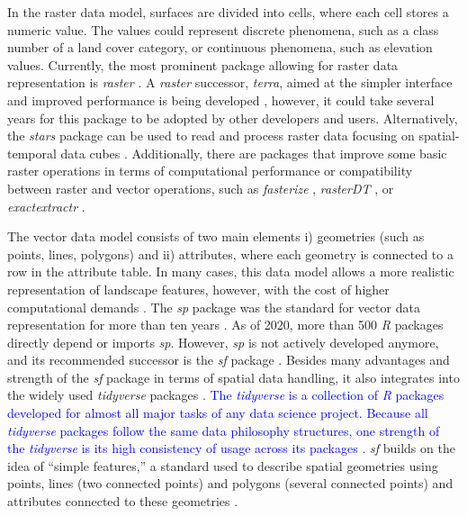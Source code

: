 \documentclass[smallextended]{svjour3}       %
\begin{document}
In the raster data model, surfaces are divided into cells, where each cell stores a numeric value.
The values could represent discrete phenomena, such as a class number of a land cover category, or continuous phenomena, such as elevation values.
Currently, the most prominent package allowing for raster data representation is \textit{raster} \cite{Hijmans2019}.
A \textit{raster} successor, \textit{terra}, aimed at the simpler interface and improved performance is being developed \cite{Hijmans2021}, however, it could take several years for this package to be adopted by other developers and users.
Alternatively, the \textit{stars} package can be used to read and process raster data focusing on spatial-temporal data cubes \cite{Pebesma2019}.
Additionally, there are packages that improve some basic raster operations in terms of computational performance or compatibility between raster and vector operations, such as \textit{fasterize} \cite{Ross2020}, \textit{rasterDT} \cite{OBrien2020}, or \textit{exactextractr} \cite{Baston2020}.

The vector data model consists of two main elements i) geometries (such as points, lines, polygons) and ii) attributes, where each geometry is connected to a row in the attribute table.
In many cases, this data model allows a more realistic representation of landscape features, however, with the cost of higher computational demands \cite{Lovelace2019}.
The \textit{sp} package was the standard for vector data representation for more than ten years \cite{Pebesma2005,Bivand2013}.
As of 2020, more than 500 \textit{R} packages directly depend or imports \textit{sp}.
However, \textit{sp} is not actively developed anymore, and its recommended successor is the \textit{sf} package \cite{Pebesma2018}.
Besides many advantages and strength of the \textit{sf} package in terms of spatial data handling, it also integrates into the widely used \textit{tidyverse} packages \cite{Wickham2019}.
\textcolor{blue}{The \textit{tidyverse} is a collection of \textit{R} packages developed for almost all major tasks of any data science project. 
Because all \textit{tidyverse} packages follow the same data philosophy structures, one strength of the \textit{tidyverse} is its high consistency of usage across its packages \cite{Wickham2019}.}
\textit{sf} builds on the idea of ``simple features,'' a standard used to describe spatial geometries using points, lines (two connected points) and polygons (several connected points) and attributes connected to these geometries \cite{Pebesma2019a}.
\end{document}
